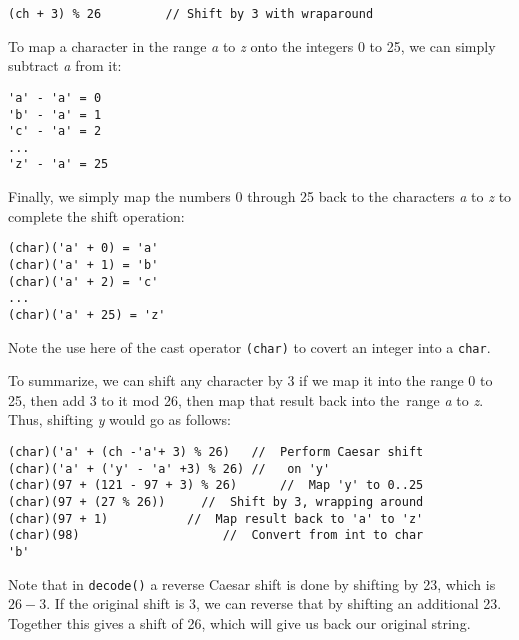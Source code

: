 \begin{jjjlisting}
\begin{lstlisting}
(ch + 3) % 26         // Shift by 3 with wraparound
\end{lstlisting}
\end{jjjlisting}

\noindent To map a character in the range {\it a} to {\it z} onto the
integers 0 to 25, we can simply subtract {\it a} from it:


\begin{jjjlisting}
\begin{lstlisting}
'a' - 'a' = 0
'b' - 'a' = 1
'c' - 'a' = 2
...
'z' - 'a' = 25
\end{lstlisting}
\end{jjjlisting}

\noindent Finally, we simply map the numbers 0 through 25 back to the
characters {\it a} to {\it z} to complete the shift operation:

\begin{jjjlisting}
\begin{lstlisting}
(char)('a' + 0) = 'a'
(char)('a' + 1) = 'b'
(char)('a' + 2) = 'c'
...
(char)('a' + 25) = 'z'
\end{lstlisting}
\end{jjjlisting}

\noindent Note the use here of the cast operator {\tt (char)} to
covert an integer into a {\tt char}.

To summarize, we can shift any character by 3 if we map it into the
range 0 to 25, then add 3 to it mod 26, then map that result back into
the~range {\it a} to {\it z}. Thus, shifting {\it y} would go as follows:

\begin{jjjlisting}
\begin{lstlisting}
(char)('a' + (ch -'a'+ 3) % 26)   //  Perform Caesar shift
(char)('a' + ('y' - 'a' +3) % 26) //   on 'y'
(char)(97 + (121 - 97 + 3) % 26)      //  Map 'y' to 0..25
(char)(97 + (27 % 26))     //  Shift by 3, wrapping around
(char)(97 + 1)           //  Map result back to 'a' to 'z'
(char)(98)                    //  Convert from int to char
'b'
\end{lstlisting}
\end{jjjlisting}

\noindent  Note that in {\tt decode()} a reverse
Caesar shift is done by shifting by 23, which is $26-3$. If the original
shift is 3, we can reverse that by shifting an additional 23. Together
this gives a shift of 26, which will give us back our original string.

